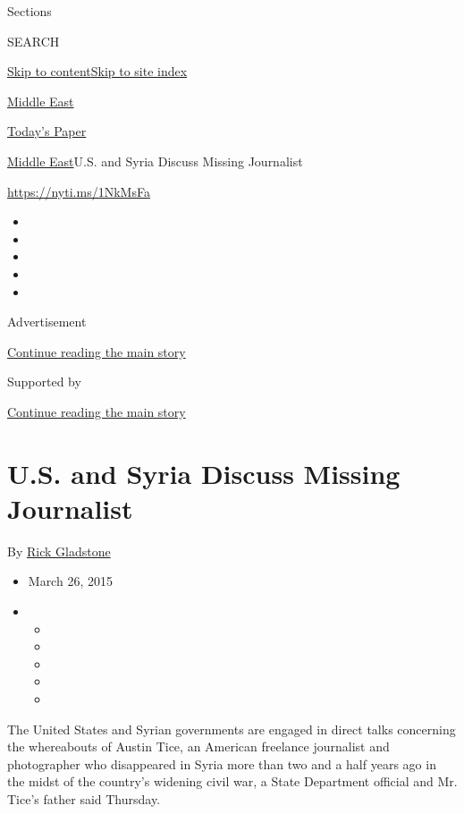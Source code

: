 Sections

SEARCH

\protect\hyperlink{site-content}{Skip to
content}\protect\hyperlink{site-index}{Skip to site index}

\href{https://www.nytimes.com/section/world/middleeast}{Middle East}

\href{https://myaccount.nytimes.com/auth/login?response_type=cookie\&client_id=vi}{}

\href{https://www.nytimes.com/section/todayspaper}{Today's Paper}

\href{/section/world/middleeast}{Middle East}\textbar{}U.S. and Syria
Discuss Missing Journalist

\url{https://nyti.ms/1NkMsFa}

\begin{itemize}
\item
\item
\item
\item
\item
\end{itemize}

Advertisement

\protect\hyperlink{after-top}{Continue reading the main story}

Supported by

\protect\hyperlink{after-sponsor}{Continue reading the main story}

\hypertarget{us-and-syria-discuss-missing-journalist}{%
\section{U.S. and Syria Discuss Missing
Journalist}\label{us-and-syria-discuss-missing-journalist}}

By \href{https://www.nytimes.com/by/rick-gladstone}{Rick Gladstone}

\begin{itemize}
\item
  March 26, 2015
\item
  \begin{itemize}
  \item
  \item
  \item
  \item
  \item
  \end{itemize}
\end{itemize}

The United States and Syrian governments are engaged in direct talks
concerning the whereabouts of Austin Tice, an American freelance
journalist and photographer who disappeared in Syria more than two and a
half years ago in the midst of the country's widening civil war, a State
Department official and Mr. Tice's father said Thursday.

